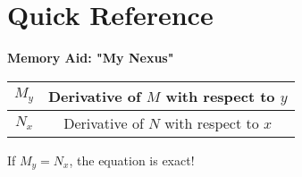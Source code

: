 \documentclass[12pt]{article}
\begin{document}
\section{Quick Reference}

\begin{keypoint}
\textbf{Memory Aid: "My Nexus"}
\begin{center}
\begin{tabular}{|c|c|}
\hline
$M_y$ & Derivative of $M$ with respect to $y$ \\
\hline
$N_x$ & Derivative of $N$ with respect to $x$ \\
\hline
\end{tabular}
\end{center}
If $M_y = N_x$, the equation is exact!
\end{keypoint}
\end{document}
